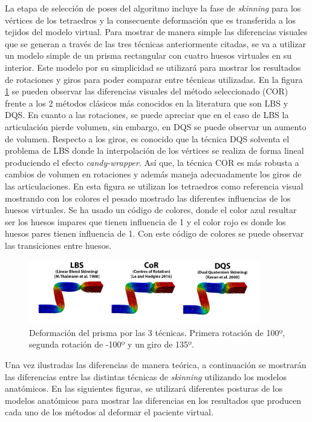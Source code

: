 La etapa de selección de poses del algoritmo incluye la fase de \emph{skinning} para los vértices de los tetraedros y la consecuente deformación que es transferida a los tejidos del modelo virtual. Para mostrar de manera simple las diferencias visuales que se generan a través de las tres técnicas anteriormente citadas, se va a utilizar un modelo simple de un prisma rectangular con cuatro huesos virtuales en su interior. Este modelo por su simplicidad se utilizará para mostrar los resultados de rotaciones y giros para poder comparar entre técnicas utilizadas. En la figura \ref{fig:bar_bending} se pueden observar las diferencias visuales del método seleccionado (\ac{COR}) frente a los 2 métodos clásicos más conocidos en la literatura que son \ac{LBS} y \ac{DQS}. En cuanto a las rotaciones, se puede apreciar que en el caso de \ac{LBS} la articulación pierde volumen, sin embargo, en \ac{DQS} se puede observar un aumento de volumen. Respecto a los giros, es conocido que la técnica \ac{DQS} solventa el problema de \ac{LBS} donde la interpolación de los vértices se realiza de forma lineal produciendo el efecto \emph{candy-wrapper}. Así que, la técnica \ac{COR} es más robusta a cambios de volumen en rotaciones y además maneja adecuadamente los giros de las articulaciones. En esta figura se utilizan los tetraedros como referencia visual mostrando con los colores el pesado mostrado las diferentes influencias de los huesos virtuales. Se ha usado un código de colores, donde el color azul resultar ser los huesos impares que tienen influencia de 1 y el color rojo es donde los huesos pares tienen influencia de 1. Con este código de colores se puede observar las transiciones entre huesos.

\begin{figure}[h]%
  \centering
  \includegraphics[width=0.90\textwidth]{IMG/BarraCoR}
    \caption{Deformación del prisma por las 3 técnicas. Primera rotación de 100º, segunda rotación de -100º y un giro de 135º.}
    \label{fig:bar_bending}
\end{figure}

Una vez ilustradas las diferencias de manera teórica, a continuación se mostrarán las diferencias entre las distintas técnicas de \emph{skinning} utilizando los modelos anatómicos. En las siguientes figuras, se utilizará diferentes posturas de los modelos anatómicos para mostrar las diferencias en los resultados que producen cada uno de los métodos al deformar el paciente virtual.


